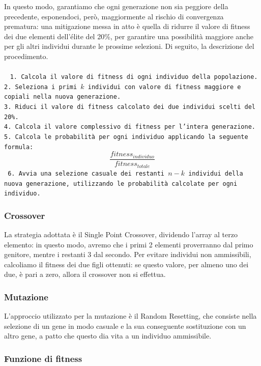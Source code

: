 \documentclass{CSUniSchoolLabReport}
\begin{document}
In questo modo, garantiamo che ogni generazione non sia peggiore della precedente, esponendoci, però, maggiormente al rischio di convergenza prematura: una mitigazione messa in atto è quella di ridurre il valore di fitness dei due elementi dell'élite del 20\%, per garantire una possibilità maggiore anche per gli altri individui durante le prossime selezioni. Di seguito, la descrizione del procedimento.
\\\\~
\texttt{1. Calcola il valore di fitness di ogni individuo della popolazione. \\
2. Seleziona i primi $k$ individui con valore di fitness maggiore e copiali nella nuova generazione. \\
3. Riduci il valore di fitness calcolato dei due individui scelti del 20\%. \\
4. Calcola il valore complessivo di fitness per l'intera generazione. \\
5. Calcola le probabilità per ogni individuo applicando la seguente formula: $$\frac{fitness_{individuo}}{fitness_{totale}}$$
6. Avvia una selezione casuale dei restanti $n-k$ individui della nuova generazione, utilizzando le probabilità calcolate per ogni individuo.
}

\subsubsection{Crossover}

La strategia adottata è il Single Point Crossover, dividendo l'array al terzo elemento: in questo modo, avremo che i primi 2 elementi proverranno dal primo genitore, mentre i restanti 3 dal secondo. Per evitare individui non ammissibili, calcoliamo il fitness dei due figli ottenuti: se questo valore, per almeno uno dei due, è pari a zero, allora il crossover non si effettua.


\subsubsection{Mutazione}

L'approccio utilizzato per la mutazione è il Random Resetting, che consiste nella selezione di un gene in modo casuale e la sua conseguente sostituzione con un altro gene, a patto che questo dia vita a un individuo ammissibile.

\pagebreak{}
\subsubsection{Funzione di fitness}
\end{document}
